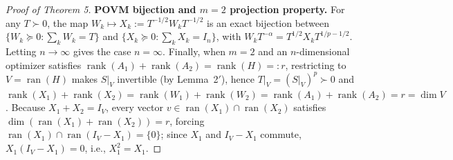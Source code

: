 \documentclass[10pt,letterpaper]{article}
\newcommand{\ran}{\operatorname{ran}}
\newcommand{\rank}{\operatorname{rank}}
\begin{document}
\begin{proof}[Proof of Theorem 5]
\textbf{POVM bijection and $m = 2$ projection property.} For any $T \succ 0$, the map $W_k \mapsto X_k := T^{-1/2} W_k T^{-1/2}$ is an exact bijection between $\{W_k \succeq 0 : \sum_k W_k = T\}$ and $\{X_k \succeq 0 : \sum_k X_k = I_n\}$, with $W_k T^{-\alpha} = T^{1/2} X_k T^{1/p - 1/2}$. Letting $n \to \infty$ gives the case $n = \infty$. Finally, when $m = 2$ and an $n$-dimensional optimizer satisfies $\rank(A_1) + \rank(A_2) = \rank(H) =: r$, restricting to $V = \ran(H)$ makes $S|_V$ invertible (by Lemma~2$'$), hence $T|_V = (S|_V)^p \succ 0$ and $\rank(X_1) + \rank(X_2) = \rank(W_1) + \rank(W_2) = \rank(A_1) + \rank(A_2) = r = \dim V$. Because $X_1 + X_2 = I_V$, every vector $v \in \ran(X_1) \cap \ran(X_2)$ satisfies $\dim(\ran(X_1) + \ran(X_2)) = r$, forcing $\ran(X_1) \cap \ran(I_V - X_1) = \{0\}$; since $X_1$ and $I_V - X_1$ commute, $X_1(I_V - X_1) = 0$, i.e., $X_1^2 = X_1$.
\end{proof}
\end{document}
